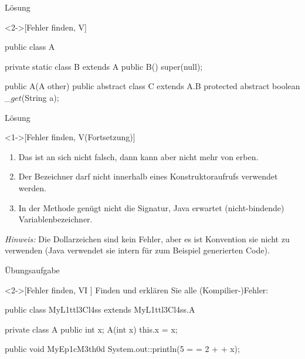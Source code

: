 \begin{frame}[c,fragile]{Lösung}
    \begin{solve}<2->[Fehler finden, V]
        \pause{}\footnotesize\begin{plainjava}
public class A {
    private static class B extends A {
        public B() {
            super(null);
        }
    }

    public A(A other){}
    public abstract class C extends A.B {
        protected abstract boolean _$get$(String a);
    }
}
        \end{plainjava}
    \end{solve}
\end{frame}

\begin{frame}[c]{Lösung}
    \addtocounter{solve}{-1}
    \begin{solve}<1->[Fehler finden, V\hfill{}(Fortsetzung)]
        \begin{enumerate}
            \item Das  ist an sich nicht falsch, dann kann aber  nicht mehr von  erben.
            \item Der Bezeichner  darf nicht innerhalb eines Konstruktoraufrufs verwendet werden.
            \item In der Methode  genügt nicht die Signatur,\pause{} Java erwartet (nicht-bindende) Variablenbezeichner.
        \end{enumerate}
        \pause{}\textit{Hinweis:}\pause{} Die Dollarzeichen sind kein Fehler,\pause{} aber es ist Konvention sie nicht zu verwenden (Java verwendet sie intern für zum Beispiel generierten Code).
    \end{solve}
\end{frame}

\begin{frame}[c,fragile]{Übungsaufgabe}
    \begin{exercise}<2->[Fehler finden, VI ]
        \pause{}Finden und erklären Sie alle (Kompilier-)Fehler:\pause{}
{\footnotesize
        \begin{plainvoid}
public class MyL1ttl3Cl4ss extends MyL1ttl3Cl4ss.A {
    private class A {
        public int x;
        A(int x) { this.x = x; }
    }

    public void MyEp1cM3th0d {
        System.out::println(5 = = 2 + + x);
    }
}
        \end{plainvoid}
}
    \end{exercise}
\end{frame}

